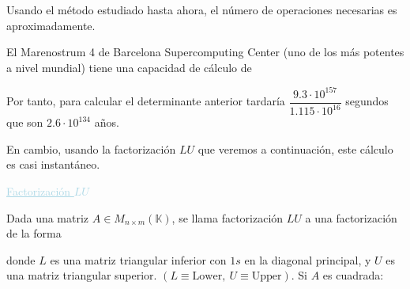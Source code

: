 \documentclass[12pt]{article}
\begin{document}
Usando el método estudiado hasta ahora, el número de operaciones
necesarias es aproximadamente.
\begin{center}
\end{center}
El Marenostrum 4 de Barcelona Supercomputing Center (uno de los
más potentes a nivel mundial) tiene una capacidad de cálculo de
\begin{center}
\end{center}
Por tanto, para calcular el determinante anterior tardaría
$\dfrac{9.3\cdot10^{157}}{1.115\cdot10^{16}}$ segundos que son
$2.6\cdot10^{134}$ años.

En cambio, usando la factorización $LU$ que veremos a
continuación, este cálculo es casi instantáneo.

\textcolor{lightblue}{\underline{Factorización $LU$}}

Dada una matriz $A\in M_{n\times m}(\mathbb{K})$, se llama
factorización $LU$ a una factorización de la forma
\begin{center}
\end{center}
donde $L$ es una matriz triangular inferior con $1s$ en la
diagonal principal, y $U$ es una matriz triangular superior.
$(L\equiv\text{Lower},~U\equiv\text{Upper})$. Si $A$ es
cuadrada:

\end{document}
